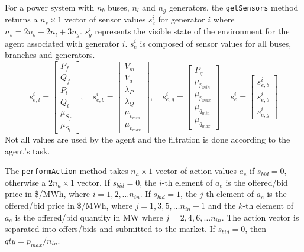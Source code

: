 

For a power system with $n_b$ buses, $n_l$ and $n_g$ generators, the
\texttt{getSensors} method returns a $n_s \times 1$ vector of sensor values
$s^i_e$ for generator $i$ where $n_s = 2n_b + 2n_l + 3n_g$.  $s^i_g$ represents
the visible state of the environment for the agent associated with generator
$i$.  $s^i_e$ is composed of sensor values for all buses, branches and
generators.
\begin{equation}
s^i_{e,l} =
\begin{bmatrix}
P_f\\
Q_f\\
P_t\\
Q_t\\
\mu_{S_f}\\
\mu_{S_t}
\end{bmatrix}, \quad
s^i_{e,b} =
\begin{bmatrix}
V_m\\
V_a\\
\lambda_P\\
\lambda_Q\\
\mu_{v_{min}}\\
\mu_{v_{max}}
\end{bmatrix}, \quad
s^i_{e,g} =
\begin{bmatrix}
P_g\\
\mu_{p_{min}}\\
\mu_{p_{max}}\\
\mu_{q_{min}}\\
\mu_{q_{max}}
\end{bmatrix}\ \quad
s^i_e =
\begin{bmatrix}
s^i_{e,b}\\
s^i_{e,b}\\
s^i_{e,g}
\end{bmatrix}
\end{equation}
Not all values are used by the agent and the filtration is done according to
the agent's task.

The \texttt{performAction} method takes $n_a \times 1$ vector of action values
$a_e$ if $s_{bid} = 0$, otherwise a $2n_a \times 1$ vector.  If $s_{bid} = 0$,
the $i$-th element of $a_e$ is the offered/bid price in \$/MWh, where
$i = 1,2,\dotsc n_{in}$.  If $s_{bid} = 1$, the $j$-th element of $a_e$ is the
offered/bid price in \$/MWh, where $j = 1,3,5,\dotsc n_{in}-1$ and the $k$-th
element of $a_e$ is the offered/bid quantity in MW where $j = 2,4,6,\dotsc
n_{in}$.  The action vector is separated into offers/bids and submitted to the
market.  If $s_{bid} = 0$, then $qty = p_{max}/n_{in}$.

